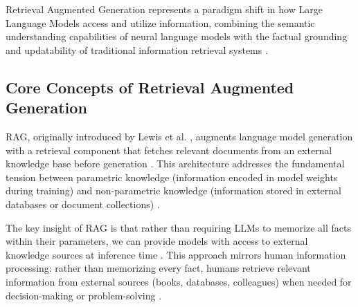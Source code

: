 Retrieval Augmented Generation represents a paradigm shift in how Large Language Models access and utilize information, combining the semantic understanding capabilities of neural language models with the factual grounding and updatability of traditional information retrieval systems \cite{lewis2021retrievalaugmentedgenerationknowledgeintensivenlp}.

\subsection{Core Concepts of Retrieval Augmented Generation}

RAG, originally introduced by Lewis et al. \cite{lewis2021retrievalaugmentedgenerationknowledgeintensivenlp}, augments language model generation with a retrieval component that fetches relevant documents from an external knowledge base before generation \cite{lewis2021retrievalaugmentedgenerationknowledgeintensivenlp}. This architecture addresses the fundamental tension between parametric knowledge (information encoded in model weights during training) and non-parametric knowledge (information stored in external databases or document collections) \cite{lewis2021retrievalaugmentedgenerationknowledgeintensivenlp}.

The key insight of RAG is that rather than requiring LLMs to memorize all facts within their parameters, we can provide models with access to external knowledge sources at inference time \cite{borgeaud2022improvinglanguagemodelsretrieving}. This approach mirrors human information processing: rather than memorizing every fact, humans retrieve relevant information from external sources (books, databases, colleagues) when needed for decision-making or problem-solving \cite{borgeaud2022improvinglanguagemodelsretrieving}.

